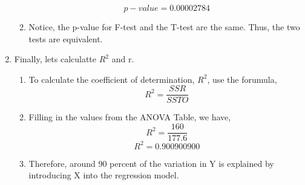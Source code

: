 \documentclass{article}
\begin{document}
\begin{enumerate}[label = \alph*)]
\begin{enumerate}[label = \arabic*)]
			\[p-value = 0.00002784\]
			\item Notice, the p-value for F-test and the T-test are the same. Thus, the two tests are equivalent.
		\end{enumerate}
		\item Finally, lets calculatte $R^2$ and r.
		\begin{enumerate}
			\item To calculate the coefficient of determination, $R^2$, use the forumula,
			\[R^2 = \frac{SSR}{SSTO}\]
			\item Filling in the values from the ANOVA Table, we have,
			\[R^2 = \frac{160}{177.6}\]
			\[R^2 = 0.900900900\]
			\item Therefore, around 90 percent of the variation in Y is explained by introducing X into the regression model.
		\end{enumerate}
	\end{enumerate}
\end{document}
